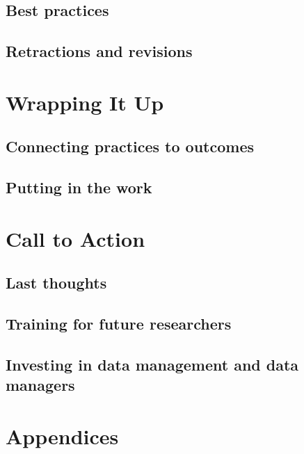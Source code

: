 \documentclass[
]{book}
\begin{document}
\hypertarget{best-practices}{%
\section{Best practices}\label{best-practices}}

\hypertarget{retractions-and-revisions}{%
\section{Retractions and revisions}\label{retractions-and-revisions}}

\hypertarget{wrapping-it-up}{%
\chapter{Wrapping It Up}\label{wrapping-it-up}}

\hypertarget{connecting-practices-to-outcomes}{%
\section{Connecting practices to outcomes}\label{connecting-practices-to-outcomes}}

\hypertarget{putting-in-the-work}{%
\section{Putting in the work}\label{putting-in-the-work}}

\hypertarget{call-to-action}{%
\chapter{Call to Action}\label{call-to-action}}

\hypertarget{last-thoughts}{%
\section{Last thoughts}\label{last-thoughts}}

\hypertarget{training-for-future-researchers}{%
\section{Training for future researchers}\label{training-for-future-researchers}}

\hypertarget{investing-in-data-management-and-data-managers}{%
\section{Investing in data management and data managers}\label{investing-in-data-management-and-data-managers}}

\hypertarget{appendices}{%
\chapter{Appendices}\label{appendices}}

\printbibliography
\end{document}

